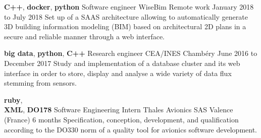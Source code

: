 \documentclass[11pt,a4paper]{moderncv}
\begin{document}
  \cventry
    {\textbf{C++}, \textbf{docker}, \textbf{python}}
    {Software engineer}
    {WiseBim}
    {Remote work}
    {January 2018 to July 2018}{
      Set up of a SAAS architecture allowing to automatically generate 3D
	  building information modeling (BIM) based on architectural 2D plans in
	  a secure and reliable manner through a web interface.
    }

  \cventry
    {\textbf{big data}, \textbf{python}, \textbf{C++}}
    {Research engineer}
    {CEA/INES}
    {Chambéry}
    {June 2016 to December 2017}{
      Study and implementation of a database cluster and its web interface in
      order to store, display and analyse a wide variety of data flux stemming
      from sensors.
    }

  \cventry
    {\textbf{ruby}, \\ \textbf{XML}, \textbf{DO178}}
    {Software Engineering Intern}
    {Thales Avionics SAS}
    {Valence (France)}
    {6 months}{
      Specification, conception,  development, and qualification according to
      the DO330 norm of a quality tool for avionics software development.
    }





\end{document}
